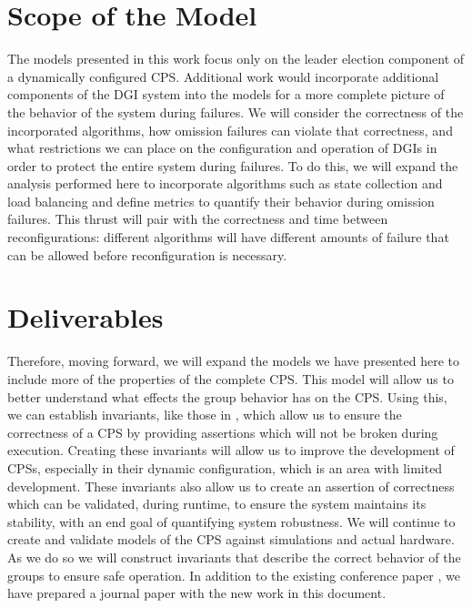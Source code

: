 \section{Scope of the Model}

The models presented in this work focus only on the leader election component of a dynamically configured CPS. Additional work would incorporate additional components of the DGI system into the models for a more complete picture of the behavior of the system during failures. We will consider the correctness of the incorporated algorithms, how omission failures can violate that correctness, and what restrictions we can place on the configuration and operation of DGIs in order to protect the entire system during failures. To do this, we will expand the analysis performed here to incorporate algorithms such as state collection and load balancing and define metrics to quantify their behavior during omission failures. This thrust will pair with the correctness and time between reconfigurations: different algorithms will have different amounts of failure that can be allowed before reconfiguration is necessary.

\section{Deliverables}

Therefore, moving forward, we will expand the models we have presented here to include more of the properties of the complete CPS. This model will allow us to better understand what effects the group behavior has on the CPS. Using this, we can establish invariants, like those in \cite{HARINI}\cite{CPS1}\cite{CPS2}, which allow us to ensure the correctness of a CPS by providing assertions which will not be broken during execution. Creating these invariants will allow us to improve the development of CPSs, especially in their dynamic configuration, which is an area with limited development. These invariants also allow us to create an assertion of correctness which can be validated, during runtime, to ensure the system maintains its stability, with an end goal of quantifying system robustness. We will continue to create and validate models of the CPS against simulations and actual hardware. As we do so we will construct invariants that describe the correct behavior of the groups to ensure safe operation. In addition to the existing conference paper \cite{CRITIS2012}, we have prepared a journal paper with the new work in this document. 